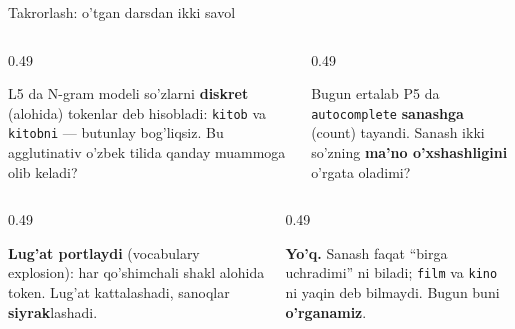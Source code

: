 \documentclass[aspectratio=169,11pt]{beamer}
\begin{document}
\begin{frame}{Takrorlash: o'tgan darsdan ikki savol}
  \begin{columns}[T]
    \begin{column}{0.49\textwidth}
      \begin{tcolorbox}[warnbox,title=1-savol]
        \small
        L5 da N-gram modeli so'zlarni \textbf{diskret} (alohida) tokenlar deb
        hisobladi: \texttt{kitob} va \texttt{kitobni} --- butunlay bog'liqsiz.
        Bu agglutinativ o'zbek tilida qanday muammoga olib keladi?
      \end{tcolorbox}
    \end{column}
    \begin{column}{0.49\textwidth}
      \begin{tcolorbox}[warnbox,title=2-savol]
        \small
        Bugun ertalab P5 da \texttt{autocomplete} \textbf{sanashga} (count)
        tayandi. Sanash ikki so'zning \textbf{ma'no o'xshashligini} o'rgata
        oladimi?
      \end{tcolorbox}
    \end{column}
  \end{columns}
  \pause
  \vspace{4pt}
  \begin{columns}[T]
    \begin{column}{0.49\textwidth}
      \begin{tcolorbox}[okbox,title=1-javob]
        \small
        \textbf{Lug'at portlaydi} (vocabulary explosion): har qo'shimchali shakl
        alohida token. Lug'at kattalashadi, sanoqlar \textbf{siyrak}lashadi.
      \end{tcolorbox}
    \end{column}
    \begin{column}{0.49\textwidth}
      \begin{tcolorbox}[okbox,title=2-javob]
        \small
        \textbf{Yo'q.} Sanash faqat ``birga uchradimi'' ni biladi; \texttt{film}
        va \texttt{kino} ni yaqin deb bilmaydi. Bugun buni \textbf{o'rganamiz}.
      \end{tcolorbox}
    \end{column}
  \end{columns}
\end{frame}
\end{document}
